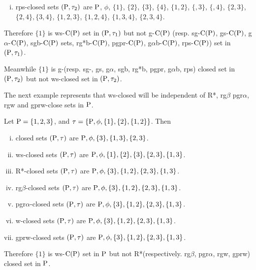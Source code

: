 \begin{exm}
\begin{enumerate}[(i)]
\item rps-closed sets $(\mathrm{P}, \tau_{2})$ are $\mathrm{P}$, $\phi$, $\{1\}$, $\{2\}$, $\{3\}$, $\{4\}$, $\{1, 2\}$, $\{, 3\}$, $\{, 4\}$, $\{2, 3\}$, $\{2, 4\}, \{3, 4\}$, $\{1, 2, 3\}$, $\{1, 2, 4\}$, $\{1, 3, 4\}$, $\{2, 3, 4\}$.
\end{enumerate}

Therefore $\{1\}$ is ws-$\mathrm{C}(\mathrm{P})$ set in $(\mathrm{P}, \tau_{1})$ but not g-$\mathrm{C}(\mathrm{P})$ (resp. sg-$\mathrm{C}(\mathrm{P})$, gs-$\mathrm{C}(\mathrm{P})$, g$\alpha$-$\mathrm{C}(\mathrm{P})$, sgb-$\mathrm{C}(\mathrm{P})$ sets, rg*b-$\mathrm{C}(\mathrm{P})$, pgpr-$\mathrm{C}(\mathrm{P})$, g$\alpha$b-$\mathrm{C}(\mathrm{P})$, rps-$\mathrm{C}(\mathrm{P})$) set in $(\mathrm{P}, \tau_{1})$.

Meanwhile $\{1\}$ is g-(resp. sg-, gs, g$\alpha$, sgb, rg*b, pgpr, g$\alpha$b, rps) closed set in $(\mathrm{P}, \tau_{2})$ but not ws-closed set in $(\mathrm{P}, \tau_{2})$.
\end{exm}

\begin{rem}\label{rem2.2.20}
The next example represents that ws-closed will be independent of R*, rg$\beta$ pgr$\alpha$, rgw and gprw-close sets in $\mathrm{P}$.
\end{rem}

\begin{exm}\label{exm2.2.21}
Let $\mathrm{P}=\{1,2,3\}$, and $\tau=\{\mathrm{P},\phi,\{1\},\{2\},\{1,2\}\}$. Then
\begin{enumerate}[(i)]
\item closed sets $(\mathrm{P}, \tau)$ are $\mathrm{P}, \phi,\{3\},\{1, 3\},\{2, 3\}$.
\item ws-closed sets $(\mathrm{P}, \tau)$ are $\mathrm{P}, \phi, \{1\},\{2\},\{3\},\{2, 3\}, \{1, 3\}$.
\item R*-closed sets $(\mathrm{P}, \tau)$ are $\mathrm{P}, \phi,\{3\},\{1, 2\},\{2, 3\},\{1, 3\}$.
\item rg$\beta$-closed sets $(\mathrm{P}, \tau)$ are $\mathrm{P}, \phi,\{3\},\{1, 2\},\{2, 3\},\{1, 3\}$.
\item pgr$\alpha$-closed sets $(\mathrm{P}, \tau)$ are $\mathrm{P}, \phi,\{3\},\{1, 2\},\{2, 3\},\{1, 3\}$.
\item w-closed sets $(\mathrm{P},\tau)$ are $\mathrm{P}, \phi,\{3\},\{1, 2\},\{2, 3\},\{1, 3\}$.
\item gprw-closed sets $(\mathrm{P}, \tau)$ are $\mathrm{P}, \phi,\{3\},\{1, 2\},\{2, 3\},\{1, 3\}$.
\end{enumerate}

Therefore $\{1\}$ is ws-$\mathrm{C}(\mathrm{P})$ set in $\mathrm{P}$ but not R*(respectively. rg$\beta$, pgr$\alpha$, rgw, gprw) closed set in $\mathrm{P}$.
\end{exm}

